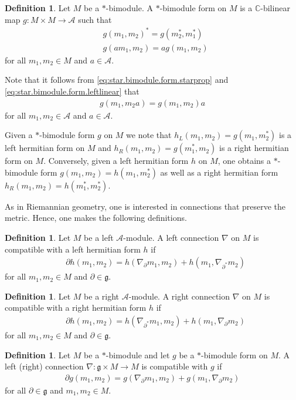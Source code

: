 \documentclass{amsart}
\newcommand{\complex}{\mathbb{C}}
\theoremstyle{definition}
\newtheorem{definition}[theorem]{Definition}
\theoremstyle{remark}
\numberwithin{equation}{section}
\newcommand{\A}{\mathcal{A}}
\renewcommand{\d}{\partial}
\newcommand{\g}{\mathfrak{g}}
\begin{document}
\begin{definition}
  Let $M$ be a $\ast$-bimodule. A $\ast$-bimodule form on $M$ is
  a $\complex$-bilinear map $g:M\times M\to\A$ such that
  \begin{align}
    &g(m_1,m_2)^\ast = g(m_2^\ast,m_1^\ast)\label{eq:star.bimodule.form.starprop}\\
    &g(am_1,m_2) = ag(m_1,m_2)\label{eq:star.bimodule.form.leftlinear}
  \end{align}
  for all $m_1,m_2\in M$ and $a\in\A$.
\end{definition}

\noindent
Note that it follows from \eqref{eq:star.bimodule.form.starprop} and
\eqref{eq:star.bimodule.form.leftlinear} that
\begin{align}
  g(m_1,m_2 a) = g(m_1,m_2)a
\end{align}
for all $m_1,m_2\in\A$ and $a\in\A$.

Given a $\ast$-bimodule form $g$ on $M$ we note that
$h_L(m_1,m_2)=g(m_1,m_2^\ast)$ is a left hermitian form on $M$ and
$h_R(m_1,m_2)=g(m_1^\ast,m_2)$ is a right hermitian form on
$M$. Conversely, given a left hermitian form $h$ on $M$, one obtains a
$\ast$-bimodule form $g(m_1,m_2)=h(m_1,m_2^\ast)$ as well as a right
hermitian form $h_R(m_1,m_2)=h(m_1^\ast,m_2^\ast)$.

As in Riemannian geometry, one is interested in connections that
preserve the metric. Hence, one makes the following definitions.

\begin{definition}
  Let $M$ be a left $\A$-module. A left connection $\nabla$ on $M$ is
  compatible with a left hermitian form $h$ if
  \begin{align*}
    &\d h(m_1,m_2) = h(\nabla_\d m_1,m_2) + h(m_1,\nabla_{\d^\ast}m_2)
  \end{align*}
  for all $m_1,m_2\in M$ and $\d\in\g$.
\end{definition}

\begin{definition}
  Let $M$ be a right $\A$-module. A right connection $\nabla$ on $M$ is
  compatible with a right hermitian form $h$ if
  \begin{align*}
    &\d h(m_1,m_2) = h(\nabla_{\d^\ast} m_1,m_2) + h(m_1,\nabla_{\d}m_2)
  \end{align*}
  for all $m_1,m_2\in M$ and $\d\in\g$.
\end{definition}

\begin{definition}
  Let $M$ be a $\ast$-bimodule and let $g$ be a $\ast$-bimodule
  form on $M$. A left (right) connection $\nabla:\g\times M\to M$ is
  compatible with $g$ if
  \begin{align*}
    \d g(m_1,m_2) = g(\nabla_\d m_1,m_2) + g(m_1,\nabla_{\d}m_2)
  \end{align*}
  for all $\d\in\g$ and $m_1,m_2\in M$.
\end{definition}
\end{document}
